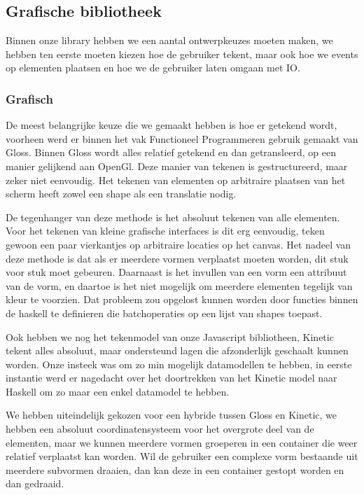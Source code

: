 \subsection{Grafische bibliotheek} \label{subsec:grafische_bibliotheek}

Binnen onze library hebben we een aantal ontwerpkeuzes moeten maken, we hebben ten eerste moeten kiezen hoe de gebruiker tekent, maar ook hoe we events op elementen plaatsen en hoe we de gebruiker laten omgaan met IO.

\subsubsection{Grafisch}
De meest belangrijke keuze die we gemaakt hebben is hoe er getekend wordt, voorheen werd er binnen het vak Functioneel Programmeren gebruik gemaakt van Gloss. Binnen Gloss wordt alles relatief getekend en dan getransleerd, op een manier gelijkend aan OpenGl. Deze manier van tekenen is gestructureerd, maar zeker niet eenvoudig. Het tekenen van elementen op arbitraire plaatsen van het scherm heeft zowel een shape als een translatie nodig.

De tegenhanger van deze methode is het absoluut tekenen van alle elementen. Voor het tekenen van kleine grafische interfaces is dit erg eenvoudig, teken gewoon een paar vierkantjes op arbitraire locaties op het canvas. Het nadeel van deze methode is dat als er meerdere vormen verplaatst moeten worden, dit stuk voor stuk moet gebeuren. Daarnaast is het invullen van een vorm een attribuut van de vorm, en daartoe is het niet mogelijk om meerdere elementen tegelijk van kleur te voorzien. Dat probleem zou opgelost kunnen worden door functies binnen de haskell te definieren die batchoperaties op een lijst van shapes toepast.

Ook hebben we nog het tekenmodel van onze Javascript bibliotheen, Kinetic tekent alles absoluut, maar ondersteund lagen die afzonderlijk geschaalt kunnen worden. Onze insteek was om zo min mogelijk datamodellen te hebben, in eerste instantie werd er nagedacht over het doortrekken van het Kinetic model naar Haskell om zo maar een enkel datamodel te hebben.

We hebben uiteindelijk gekozen voor een hybride tussen Gloss en Kinetic, we hebben een absoluut coordinatensysteem voor het overgrote deel van de elementen, maar we kunnen meerdere vormen groeperen in een container die weer relatief verplaatst kan worden. Wil de gebruiker een complexe vorm bestaande uit meerdere subvormen draaien, dan kan deze in een container gestopt worden en dan gedraaid.

